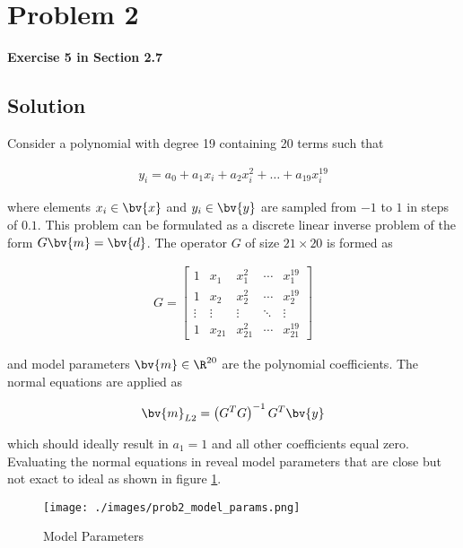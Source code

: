 
\begingroup
\allowdisplaybreaks

\newpage
\section{Problem 2}

\textbf{Exercise 5 in Section 2.7}

\subsection{Solution}

Consider a polynomial with degree 19 containing 20 terms such that

\begin{align*}
	y_i = a_0 + a_1 x_i + a_2 x_i^2 + \ldots + a_{19} x_i^{19}
\end{align*}

where elements $x_i \in \bv{x}$ and $y_i \in \bv{y}$ are sampled from $-1$ to $1$ in steps of $0.1$. This problem can be formulated as a discrete linear inverse problem of the form $G\bv{m} = \bv{d}$. The operator $G$ of size $21 \times 20$ is formed as

\begin{align*}
	G = \begin{bmatrix}
		1 & x_1 & x_1^2 & \cdots & x_1^{19} \\
		1 & x_2 & x_2^2 & \cdots & x_2^{19} \\
		\vdots & \vdots & \vdots & \ddots & \vdots \\
		1 & x_{21} & x_{21}^2 & \cdots & x_{21}^{19}
	\end{bmatrix}
\end{align*}

and model parameters $\bv{m} \in \R^{20}$ are the polynomial coefficients. The normal equations are applied as

\begin{align*}
	\bv{m}_{L2} = \left(G^T G\right)^{-1} G^T \bv{y}
\end{align*}

which should ideally result in $a_1 = 1$ and all other coefficients equal zero. Evaluating the normal equations in \MATLAB reveal model parameters that are close but not exact to ideal as shown in figure \ref{fig: prob2 model params}. 

\begin{figure}[h] 
	\centering
	\texttt{[image: ./images/prob2\_model\_params.png]}
	\caption{Model Parameters}
	\label{fig: prob2 model params}
\end{figure}
\FloatBarrier

